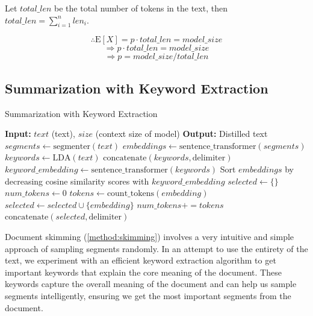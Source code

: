 Let $total\_len$ be the total number of tokens in the text, then $total\_len = \sum_{i = 1}^{n} len_i$.

\[ \therefore \mathrm{E}[X] = p \cdot total\_len = model\_size \]
\[ \Rightarrow p \cdot total\_len = model\_size \]
\[ \Rightarrow p = model\_size / total\_len \]


\subsection{Summarization with Keyword Extraction}
\label{method:keyword}

\begin{algorithm*}
  \caption{Summarization with Keyword Extraction}

  \begin{algorithmic}
    \State \textbf{Input:} $text$ (text), $size$ (context size of model)
    \State \textbf{Output:} Distilled text
    \State $segments \leftarrow \text{segmenter}(text)$
    \State $embeddings \leftarrow \text{sentence\_transformer}(segments)$
    \State $keywords \leftarrow \text{LDA}(text)$
    \State $\text{concatenate}(keywords, \text{delimiter})$
    \State $keyword\_embedding \leftarrow \text{sentence\_transformer}(keywords)$
    \State Sort $embeddings$ by decreasing cosine similarity scores with $keyword\_embedding$
    \State $selected \leftarrow \{\}$
    \State $num\_tokens \leftarrow 0$
      \State $tokens \leftarrow \text{count\_tokens}(embedding)$
        \State $selected \leftarrow selected \cup \{embedding\}$
        \State $num\_tokens += tokens$
      \EndIf
    \EndFor
    \State $\text{concatenate}(selected, \text{delimiter})$
    \State {}
  \end{algorithmic}

  \label{algo:keyword}
\end{algorithm*}

Document skimming (\autoref{method:skimming}) involves a very intuitive and simple approach of sampling segments randomly.
In an attempt to use the entirety of the text, we experiment with an efficient keyword extraction algorithm to get important keywords that explain the core meaning of the document.
These keywords capture the overall meaning of the document and can help us sample segments intelligently, ensuring we get the most important segments from the document.


